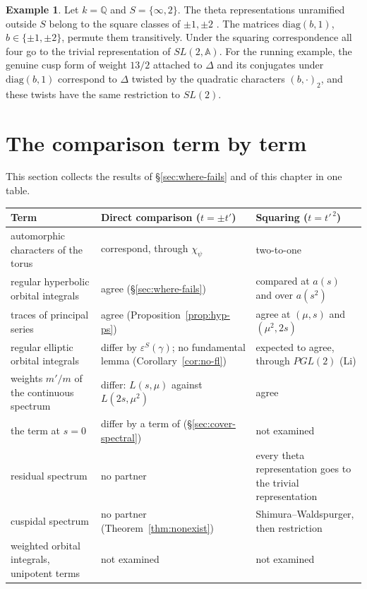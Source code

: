 \documentclass[12pt,letterpaper,openany]{book}
\theoremstyle{plain}
\theoremstyle{definition}
\newtheorem{example}[theorem]{Example}
\theoremstyle{remark}
\theoremstyle{remark}
\begin{document}
\begin{example}
Let $k={\mathbb Q}$ and $S=\{\infty,2\}$. The theta representations
unramified outside $S$ belong to the square classes of $\pm1,\pm2$
\cite[Example~5.A]{JC}. The matrices $\mathrm{diag}(b,1)$,
$b\in\{\pm1,\pm2\}$, permute them transitively. Under the squaring
correspondence all four go to the trivial representation of
$SL(2,{\mathbb A})$. For the running example, the genuine cusp form of
weight $13/2$ attached to $\Delta$ and its conjugates under
$\mathrm{diag}(b,1)$ correspond to $\Delta$ twisted by the quadratic
characters $(b,\cdot)_2$, and these twists have the same restriction to
$SL(2)$.
\end{example}

\section{The comparison term by term}\label{sec:cover-table}

This section collects the results of \S\ref{sec:where-fails} and of this
chapter in one table.

\begin{center}
\renewcommand{\arraystretch}{1.2}
\begin{tabular}{p{}p{}p{}}
\hline
Term & Direct comparison ($t=\pm t'$) & Squaring ($t=t'^{\,2}$)\\
\hline
automorphic characters of the torus & correspond, through $\chi_\psi$ &
two-to-one\\
regular hyperbolic orbital integrals & agree
(\S\ref{sec:where-fails}) & compared at $a(s)$ and over $a(s^2)$\\
traces of principal series & agree (Proposition~\ref{prop:hyp-ps}) &
agree at $(\mu,s)$ and $(\mu^2,2s)$\\
regular elliptic orbital integrals & differ by $\varepsilon^S(\gamma)$;
no fundamental lemma (Corollary~\ref{cor:no-fl}) & expected to agree,
through $PGL(2)$ (Li)\\
weights $m'/m$ of the continuous spectrum & differ: $L(s,\mu)$ against
$L(2s,\mu^2)$ & agree\\
the term at $s=0$ & differ by a term of \cite{LL}
(\S\ref{sec:cover-spectral}) & not examined\\
residual spectrum & no partner & every theta representation goes to the
trivial representation\\
cuspidal spectrum & no partner (Theorem~\ref{thm:nonexist}) &
Shimura--Waldspurger, then restriction\\
weighted orbital integrals, unipotent terms & not examined & not
examined\\
\hline
\end{tabular}
\end{center}
\end{document}
